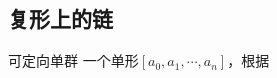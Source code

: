 
\subsection{复形上的链}

\begin{definition}{可定向单群}
一个单形$[a_0, a_1, \cdots, a_n]$，根据
\end{definition}










